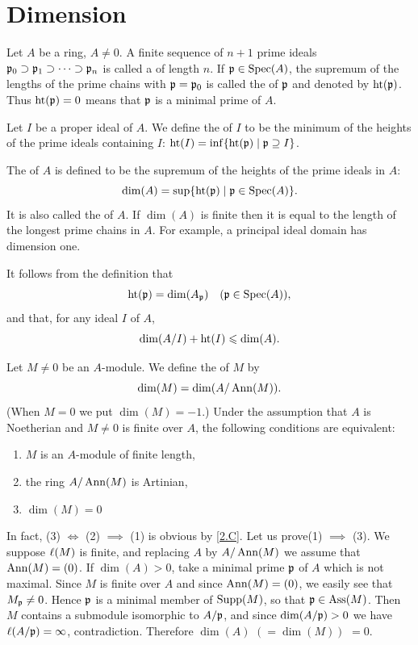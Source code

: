 \documentclass[../main]{subfiles}
\begin{document}
\section{Dimension}\label{sec:12}

\newparagraph
Let $A$ be a ring, $A \neq 0$. A finite sequence of $n+1$ prime ideals \newline $\mathfrak{p}_0 \supset \mathfrak{p}_1 \supset \cdots\supset\mathfrak{p}_n$ is called a  of length $n$. If $\mathfrak{p} \in \operatorname{Spec}(A)$, the supremum of the lengths of the prime chains with $\mathfrak{p}=\mathfrak{p}_0$ is called the  of $\mathfrak{p}$ and denoted by $\operatorname{ht}(\mathfrak{p})$. Thus $\operatorname{ht}(\mathfrak{p})=0$ means that $\mathfrak{p}$ is a minimal prime of $A$.

Let $I$ be a proper ideal of $A$. We define the  of $I$ to be the minimum of the heights of the prime ideals containing $I$: $\operatorname{ht}(I)=\inf\{\operatorname{ht}(\mathfrak{p}) \mid \mathfrak{p} \supseteq I\}$.

The  of $A$ is defined to be the supremum of the heights of the prime ideals in $A$: \[\operatorname{dim}(A)=\sup\{\operatorname{ht}(\mathfrak{p}) \mid \mathfrak{p} \in \operatorname{Spec}(A)\}.\] It is also called the  of $A$. If $\dim(A)$ is finite then it is equal to the length of the longest prime chains in $A$. For example, a principal ideal domain has dimension one.

It follows from the definition that \[\Ht(\ideal{p})=\dim(A_{\ideal{p}}) \for{\ideal{p} \in \Spec(A)},\] and that, for any ideal $I$ of $A$, \[\operatorname{dim}(A/I)+\operatorname{ht}(I)\leqslant\operatorname{dim}(A).\]

\newparagraph Let $M \neq 0$ be an $A$-module. We define the  of $M$ by \[\operatorname{dim}(M)=\operatorname{dim}(A/\operatorname{Ann}(M)).\] (When $M=0$ we put $\dim(M)=-1$.) Under the assumption that $A$ is Noetherian and $M \neq 0$ is finite over $A$, the following conditions are equivalent:
\begin{enumerate}[label=(\arabic*)]
    \item $M$ is an $A$-module of finite length,
    \item the ring $A/\operatorname{Ann}(M)$ is Artinian,
    \item $\dim(M)=0$
\end{enumerate}

In fact, (3) $\iff$ (2) $\implies$ (1) is obvious by \ref{2.C}. Let us prove\newline (1) $\implies$ (3). We suppose $\ell(M)$ is finite, and replacing $A$ by $A/\operatorname{Ann}(M)$ we assume that $\operatorname{Ann}(M)=(0)$. If $\dim(A)>0$, take a minimal prime $\mathfrak{p}$ of $A$ which is not maximal. Since $M$ is finite over $A$ and since $\operatorname{Ann}(M)=(0)$, we easily see that $M_{\mathfrak{p}} \neq 0$. Hence $\mathfrak{p}$ is a minimal member of $\operatorname{Supp}(M)$, so that $\mathfrak{p} \in \operatorname{Ass}(M)$. Then $M$ contains a submodule isomorphic to $A / \mathfrak{p}$, and since $\operatorname{dim}(A / \mathfrak{p})>0$ we have $\ell(A / \mathfrak{p})=\infty$, contradiction. Therefore $\dim(A)$ $(=\dim(M))$ $=0$.
\end{document}
